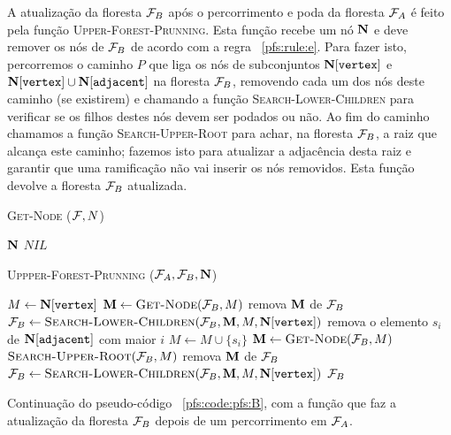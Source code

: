 \newpage
A atualização da floresta $\mathcal{F}_B$ após o percorrimento e poda da
floresta $\mathcal{F}_A$ é feito pela função \textsc{Upper-Forest-Prunning}.
Esta função recebe um nó $\mathbf N$ e deve remover os nós de 
$\mathcal{F}_B$ de acordo com a regra ~\ref{pfs:rule:e}. Para fazer isto, 
percorremos o caminho $P$ que liga os nós de subconjuntos 
$\mathbf N[\texttt{vertex}]$ e $\mathbf N[\texttt{vertex}] \cup 
\mathbf N[\texttt{adjacent}]$ na floresta $\mathcal{F}_B$, removendo cada
um dos nós deste caminho (se existirem) e chamando a função 
\textsc{Search-Lower-Children} para verificar se os filhos destes nós
devem ser podados ou não. Ao fim do caminho chamamos a função 
\textsc{Search-Upper-Root} para achar, na floresta $\mathcal{F}_B$, a raiz
que alcança este caminho; fazemos isto para atualizar a adjacência desta 
raiz e garantir que uma ramificação não vai inserir os nós removidos. 
Esta função devolve a floresta $\mathcal{F}_B$ atualizada.

\begin{algorithm}[H]
    \textsc{Get-Node} ($\mathcal{F}, N$)
    \begin{algorithmic}[1]
            \Return $\mathbf N$
        \Else
            \Return $NIL$
        \EndIf
    \end{algorithmic}
    \vspace{1em}
    \textsc{Uppper-Forest-Prunning} ($\mathcal{F}_A, \mathcal{F}_B, \mathbf N$)
    \begin{algorithmic}[1]
        \State $M \gets \mathbf N[\texttt{vertex}]$
            \State $\mathbf M \gets {\normalfont\textsc{Get-Node}} (\mathcal{F}_B, M)$
                \State remova $\mathbf M$ de $\mathcal{F}_B$
            \EndIf
            \State $\mathcal{F}_B \gets {\normalfont\textsc{Search-Lower-Children}} (\mathcal{F}_B, \mathbf M, M, \mathbf N[\texttt{vertex}])$
            \State remova o elemento $s_i$ de $\mathbf N[\texttt{adjacent}]$ com maior $i$
            \State $M \gets M \cup \{s_i\}$
        \EndWhile
        \State $\mathbf M \gets {\normalfont\textsc{Get-Node}} (\mathcal{F}_B, M)$
            \State ${\normalfont\textsc{Search-Upper-Root}} (\mathcal{F}_B, M)$
        \Else
            \State remova $\mathbf M$ de $\mathcal{F}_B$
        \EndIf
        \State $\mathcal{F}_B \gets {\normalfont\textsc{Search-Lower-Children}} (\mathcal{F}_B, \mathbf M, M, \mathbf N[\texttt{vertex}])$
        \Return $\mathcal{F}_B$
    \end{algorithmic}
    \caption{Continuação do pseudo-código ~\ref{pfs:code:pfs:B}, com a
    função que faz a atualização da floresta $\mathcal{F}_B$ depois de um 
    percorrimento em $\mathcal{F}_A$.}
    \label{pfs:code:pfs:C}
\end{algorithm}



